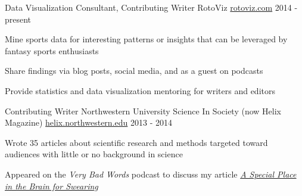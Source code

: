 

\begin{cventries}

  \cventry
    {Data Visualization Consultant, Contributing Writer} %
    {RotoViz} %
    {\href{http://rotoviz.com/author/jkloet/}{rotoviz.com}} %
    {2014 - present} %
    {
      \begin{cvitems} %
        \item {Mine sports data for interesting patterns or insights that can be leveraged by fantasy sports enthusiasts}
        \item {Share findings via blog posts, social media, and as a guest on podcasts}
        \item {Provide statistics and data visualization mentoring for writers and editors}
      \end{cvitems}
    }

  \cventry
    {Contributing Writer} %
    {Northwestern University Science In Society (now Helix Magazine)} %
    {\href{https://helix.northwestern.edu/author/jim-kloet}{helix.northwestern.edu}} %
    {2013 - 2014} %
    {
      \begin{cvitems} %
        \item {Wrote 35 articles about scientific research and methods targeted toward audiences with little or no background in science}
        \item {Appeared on the \textit{Very Bad Words} podcast to discuss my article {\href{https://helix.northwestern.edu/blog/2013/02/special-place-brain-swearing} 
        		{\textit{\color{awesome-nephritis} A Special Place in the Brain for Swearing}}}}
      \end{cvitems}
    }

\end{cventries}
